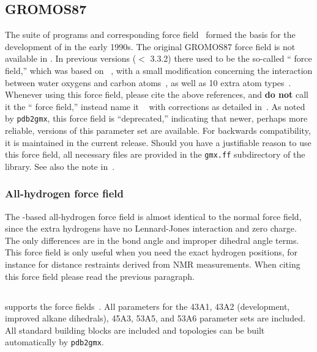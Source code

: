 \subsection{GROMOS87}
The  suite of programs and corresponding force
field~\cite{biomos} formed the basis for the development of {\gromacs}
in the early 1990s.  The original GROMOS87 force field is not
available in {\gromacs}. In previous versions ($<$ 3.3.2) there used
to be the so-called ``{\gromacs} force field,'' which was based on
~\cite{biomos}, with a small modification
concerning the interaction between water oxygens and carbon
atoms~\cite{Buuren93b,Mark94}, as well as 10 extra atom
types~\cite{Jorgensen83,Buuren93a,Buuren93b,Mark94,Liu95}. Whenever
using this force field, please cite the above references, and {\bf do not}
call it the ``{\gromacs} force field,'' instead name it
~\cite{biomos} with corrections as detailed
in~\cite{Buuren93b,Mark94}.  As noted by {\tt pdb2gmx}, this force field is
``deprecated,'' indicating that newer, perhaps more reliable, versions of this
parameter set are available.  For backwards compatibility, it is maintained 
in the current release.  Should you have a justifiable reason to use this
force field, all necessary files are provided in the {\tt gmx.ff} subdirectory
of the {\gromacs} library.  See also the note in~.

\subsubsection{All-hydrogen force field}
The -based all-hydrogen force field is almost identical to the
normal  force field, since the extra hydrogens have no
Lennard-Jones interaction and zero charge. The only differences are in
the bond angle and improper dihedral angle terms. This force field is
only useful when you need the exact hydrogen positions, for instance
for distance restraints derived from NMR measurements. When citing
this force field please read the previous paragraph.

\subsection{}
{\gromacs} supports the  force fields~\cite{gromos96}.
All parameters for the 43A1, 43A2 (development, improved alkane
dihedrals), 45A3, 53A5, and 53A6 parameter sets are included.  All standard
building blocks are included and topologies can be built automatically
by {\tt pdb2gmx}.  


